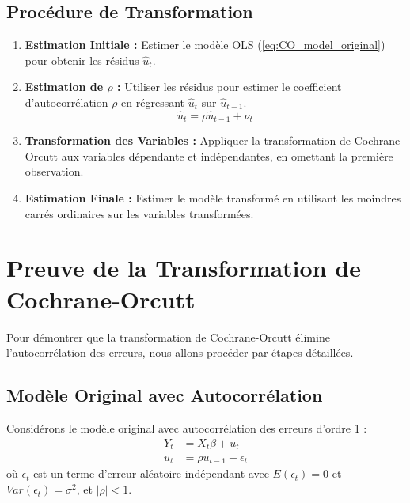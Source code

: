 \documentclass[14pt]{extarticle} %
\theoremstyle{definition}
\theoremstyle{plain}
\begin{document}
\subsection{Procédure de Transformation}
\begin{enumerate}
    \item \textbf{Estimation Initiale :} Estimer le modèle OLS (\ref{eq:CO_model_original}) pour obtenir les résidus \( \hat{u}_t \).
    \item \textbf{Estimation de \( \rho \) :} Utiliser les résidus pour estimer le coefficient d'autocorrélation \( \rho \) en régressant \( \hat{u}_t \) sur \( \hat{u}_{t-1} \).
    \begin{equation}
    \hat{u}_t = \rho \hat{u}_{t-1} + \nu_t
    \end{equation}
    \item \textbf{Transformation des Variables :} Appliquer la transformation de Cochrane-Orcutt aux variables dépendante et indépendantes, en omettant la première observation.
    \item \textbf{Estimation Finale :} Estimer le modèle transformé en utilisant les moindres carrés ordinaires sur les variables transformées.
\end{enumerate}

\section{Preuve de la Transformation de Cochrane-Orcutt}
Pour démontrer que la transformation de Cochrane-Orcutt élimine l'autocorrélation des erreurs, nous allons procéder par étapes détaillées.

\subsection{Modèle Original avec Autocorrélation}
Considérons le modèle original avec autocorrélation des erreurs d'ordre 1 :
\begin{align}
Y_t &= X_t \beta + u_t \label{eq:CO_model_original_repeat} \\
u_t &= \rho u_{t-1} + \epsilon_t \label{eq:CO_autocorr_error_repeat}
\end{align}
où \( \epsilon_t \) est un terme d'erreur aléatoire indépendant avec \( E(\epsilon_t) = 0 \) et \( Var(\epsilon_t) = \sigma^2 \), et \( |\rho| < 1 \).
\end{document}
